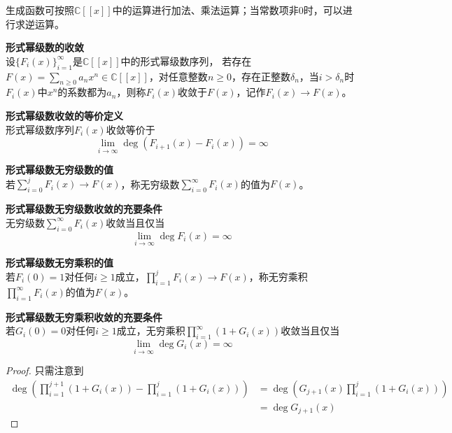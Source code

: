 \par 生成函数可按照$\mathbb{C}[[x]]$中的运算进行加法、乘法运算；当常数项非0时，可以进行求逆运算。

\begin{dfn} 
\textbf{形式幂级数的收敛}\\
设$\{F_i(x)\}_{i=1}^\infty$是$ \mathbb{C}[[x]]$中的形式幂级数序列， 若存在$F(x)=\sum_{n\ge0} a_nx^n \in \mathbb{C}[[x]]$，对任意整数$n \ge 0$，存在正整数$\delta_n$，当$i>\delta_n$时$F_i(x)$中$x^n$的系数都为$a_n$，则称$F_i(x)$收敛于$F(x)$，记作$F_i(x) \to F(x)$。
\end{dfn}

\begin{pro}
\textbf{形式幂级数收敛的等价定义}\\
形式幂级数序列$F_i(x)$收敛等价于
\begin{equation}
    \lim \limits_{i\to \infty} \deg(F_{i+1}(x)-F_{i}(x))=\infty
\end{equation}
\end{pro}

\begin{dfn} 
\textbf{形式幂级数无穷级数的值}\\
若$\sum_{i=0}^j F_i(x)\to F(x)$，称无穷级数$\sum_{i=0}^\infty F_i(x)$的值为$F(x)$。
\end{dfn}

\begin{col}
\textbf{形式幂级数无穷级数收敛的充要条件}\\
无穷级数$\sum_{i=0}^\infty F_i(x)$收敛当且仅当
\begin{equation}
    \lim \limits_{i\to \infty} \deg F_{i}(x)=\infty
\end{equation}
\label{ser_cov}
\end{col}

\begin{dfn} 
\textbf{形式幂级数无穷乘积的值}\\
若$F_i(0)=1$对任何$i\ge 1$成立，$\prod_{i=1}^j F_i(x)\to F(x)$，称无穷乘积$\prod_{i=1}^\infty F_i(x)$的值为$F(x)$。
\end{dfn}

\begin{col}
\textbf{形式幂级数无穷乘积收敛的充要条件}\\
若$G_i(0)=0$对任何$i\ge 1$成立，无穷乘积$\prod_{i=1}^\infty (1+G_i(x))$收敛当且仅当
\begin{equation}
    \lim \limits_{i\to \infty} \deg G_{i}(x)=\infty
\end{equation}
\end{col}
\begin{proof}
只需注意到
\begin{align*}
    \deg \left(\prod_{i=1}^{j+1}(1+G_i(x))-\prod_{i=1}^{j}(1+G_i(x))\right)&=\deg\left(G_{j+1}(x)\prod_{i=1}^{j}(1+G_i(x))\right)\\
    &=\deg G_{j+1}(x)
\end{align*}
\end{proof}

